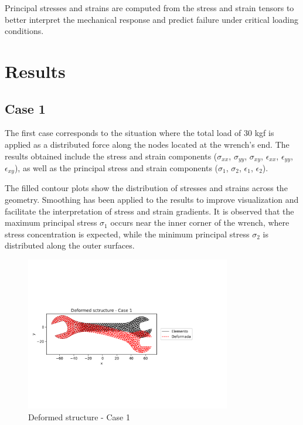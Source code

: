 \documentclass[12pt]{article}
\begin{document}
Principal stresses and strains are computed from the stress and strain tensors to better interpret the mechanical response and predict failure under critical loading conditions.

\newpage
\section{Results}

\subsection{Case 1}

The first case corresponds to the situation where the total load of 30 kgf is applied as a distributed force along the nodes located at the wrench's end.  
The results obtained include the stress and strain components ($\sigma_{xx}$, $\sigma_{yy}$, $\sigma_{xy}$, $\epsilon_{xx}$, $\epsilon_{yy}$, $\epsilon_{xy}$), as well as the principal stress and strain components ($\sigma_1$, $\sigma_2$, $\epsilon_1$, $\epsilon_2$).

The filled contour plots show the distribution of stresses and strains across the geometry. Smoothing has been applied to the results to improve visualization and facilitate the interpretation of stress and strain gradients.  
It is observed that the maximum principal stress $\sigma_1$ occurs near the inner corner of the wrench, where stress concentration is expected, while the minimum principal stress $\sigma_2$ is distributed along the outer surfaces.


\begin{figure}[H]
    \centering
    \includegraphics[width=0.8\textwidth]{Resultados/Deformed_sctructure_-_Case_1.png}
    \caption{Deformed structure - Case 1}
    \label{fig:fig1}
\end{figure}
\end{document}

